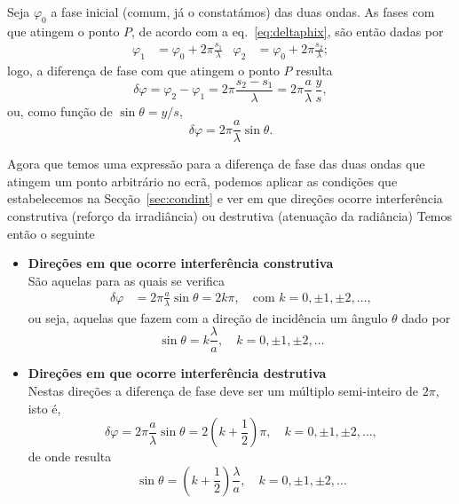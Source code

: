 Seja $\varphi_0$ a fase inicial (comum, já o constatámos) das duas ondas. As
fases com que atingem o ponto $P$, de acordo com a eq.~\eqref{eq:deltaphix}, são
então dadas por 
\begin{align*}
\varphi_1 &= \varphi_0+2\pi\frac{s_1}{\lambda}&
\varphi_2 &= \varphi_0+2\pi\frac{s_2}{\lambda};
\end{align*}
logo, a diferença de fase com que atingem o ponto $P$ resulta
\begin{equation}\label{eq:youngdf1}
\delta\varphi = \varphi_2-\varphi_1 =2\pi\frac{s_2-s_1}{\lambda}=
2\pi\frac{a}{\lambda}\,\frac{y}{s},
\end{equation}
ou, como função de $\sin\theta=y/s$,
\begin{equation}\label{eq:youngdf2}
\delta\varphi = 2\pi\frac{a}{\lambda}\sin\theta.
\end{equation}

Agora que temos uma expressão para a diferença de fase das duas ondas que
atingem um ponto arbitrário no ecrã, podemos aplicar as condições que
estabelecemos na Secção~\ref{sec:condint} e ver em que direções ocorre
interferência construtiva (reforço da irradiância) ou destrutiva (atenuação da
radiância)
Temos então o seguinte
\begin{itemize}
\item
    \textbf{Direções em que ocorre interferência construtiva}\\
    São aquelas para as quais se verifica
    \begin{align*}
    \delta\varphi &= 2\pi\frac{a}{\lambda}\sin\theta=
                    2k\pi,\quad\text{com }k=0,\pm1,\pm2,\ldots,
    \end{align*}
    ou seja, aquelas que fazem com a direção de incidência um ângulo $\theta$
    dado por
    \begin{equation}\label{eq:youngconstr}
        \sin\theta=k\frac\lambda a,\quad k=0,\pm1,\pm2,\ldots
    \end{equation}
\item
    \textbf{Direções em que ocorre interferência destrutiva}\\
    Nestas direções a diferença de fase deve ser um múltiplo semi-inteiro de
    $2\pi$, isto é,
    \begin{equation}
        \delta\varphi=2\pi\frac{a}{\lambda}\sin\theta=2\left(k+\frac12\right)
        \pi,\quad k=0,\pm1,\pm2,\ldots,
    \end{equation}
    de onde resulta
    \begin{equation*}
        \sin\theta=\left(k+\frac12\right)\frac\lambda a,\quad
        k=0,\pm1,\pm2,\ldots
    \end{equation*}
\end{itemize}

